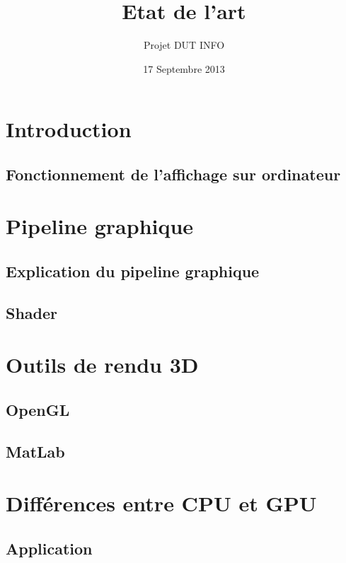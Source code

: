 \documentclass[12pt,a4paper,openany]{report}
\title{Etat de l'art}
\author{Projet DUT INFO}
\date{17 Septembre 2013}
\begin{document}
\maketitle

\hypertarget{tableofcontents}{} %
\tableofcontents

\part{Introduction}

\chapter{Fonctionnement de l'affichage sur ordinateur}



\part{Pipeline graphique}
\chapter{Explication du pipeline graphique}


\chapter{Shader}


\part{Outils de rendu 3D}

\chapter{OpenGL}


\chapter{MatLab}


\part{Différences entre CPU et GPU}
\chapter{Application}



\newpage
\end{document}
